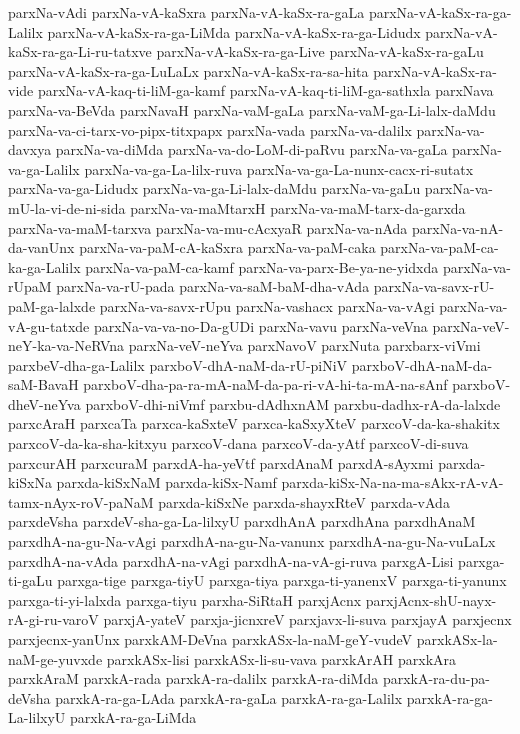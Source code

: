 {parxNa-vAdi
parxNa-vA-kaSxra
parxNa-vA-kaSx-ra-gaLa
parxNa-vA-kaSx-ra-ga-Lalilx
parxNa-vA-kaSx-ra-ga-LiMda
parxNa-vA-kaSx-ra-ga-Lidudx
parxNa-vA-kaSx-ra-ga-Li-ru-tatxve
parxNa-vA-kaSx-ra-ga-Live
parxNa-vA-kaSx-ra-gaLu
parxNa-vA-kaSx-ra-ga-LuLaLx
parxNa-vA-kaSx-ra-sa-hita
parxNa-vA-kaSx-ra-vide
parxNa-vA-kaq-ti-liM-ga-kamf
parxNa-vA-kaq-ti-liM-ga-sathxla
parxNava
parxNa-va-BeVda
parxNavaH
parxNa-vaM-gaLa
parxNa-vaM-ga-Li-lalx-daMdu
parxNa-va-ci-tarx-vo-pipx-titxpapx
parxNa-vada
parxNa-va-dalilx
parxNa-va-davxya
parxNa-va-diMda
parxNa-va-do-LoM-di-paRvu
parxNa-va-gaLa
parxNa-va-ga-Lalilx
parxNa-va-ga-La-lilx-ruva
parxNa-va-ga-La-nunx-cacx-ri-sutatx
parxNa-va-ga-Lidudx
parxNa-va-ga-Li-lalx-daMdu
parxNa-va-gaLu
parxNa-va-mU-la-vi-de-ni-sida
parxNa-va-maMtarxH
parxNa-va-maM-tarx-da-garxda
parxNa-va-maM-tarxva
parxNa-va-mu-cAcxyaR
parxNa-va-nAda
parxNa-va-nA-da-vanUnx
parxNa-va-paM-cA-kaSxra
parxNa-va-paM-caka
parxNa-va-paM-ca-ka-ga-Lalilx
parxNa-va-paM-ca-kamf
parxNa-va-parx-Be-ya-ne-yidxda
parxNa-va-rUpaM
parxNa-va-rU-pada
parxNa-va-saM-baM-dha-vAda
parxNa-va-savx-rU-paM-ga-lalxde
parxNa-va-savx-rUpu
parxNa-vashacx
parxNa-va-vAgi
parxNa-va-vA-gu-tatxde
parxNa-va-va-no-Da-gUDi
parxNa-vavu
parxNa-veVna
parxNa-veV-neY-ka-va-NeRVna
parxNa-veV-neYva
parxNavoV
parxNuta
parxbarx-viVmi
parxbeV-dha-ga-Lalilx
parxboV-dhA-naM-da-rU-piNiV
parxboV-dhA-naM-da-saM-BavaH
parxboV-dha-pa-ra-mA-naM-da-pa-ri-vA-hi-ta-mA-na-sAnf
parxboV-dheV-neYva
parxboV-dhi-niVmf
parxbu-dAdhxnAM
parxbu-dadhx-rA-da-lalxde
parxcAraH
parxcaTa
parxca-kaSxteV
parxca-kaSxyXteV
parxcoV-da-ka-shakitx
parxcoV-da-ka-sha-kitxyu
parxcoV-dana
parxcoV-da-yAtf
parxcoV-di-suva
parxcurAH
parxcuraM
parxdA-ha-yeVtf
parxdAnaM
parxdA-sAyxmi
parxda-kiSxNa
parxda-kiSxNaM
parxda-kiSx-Namf
parxda-kiSx-Na-na-ma-sAkx-rA-vA-tamx-nAyx-roV-paNaM
parxda-kiSxNe
parxda-shayxRteV
parxda-vAda
parxdeVsha
parxdeV-sha-ga-La-lilxyU
parxdhAnA
parxdhAna
parxdhAnaM
parxdhA-na-gu-Na-vAgi
parxdhA-na-gu-Na-vanunx
parxdhA-na-gu-Na-vuLaLx
parxdhA-na-vAda
parxdhA-na-vAgi
parxdhA-na-vA-gi-ruva
parxgA-Lisi
parxga-ti-gaLu
parxga-tige
parxga-tiyU
parxga-tiya
parxga-ti-yanenxV
parxga-ti-yanunx
parxga-ti-yi-lalxda
parxga-tiyu
parxha-SiRtaH
parxjAcnx
parxjAcnx-shU-nayx-rA-gi-ru-varoV
parxjA-yateV
parxja-jicnxreV
parxjavx-li-suva
parxjayA
parxjecnx
parxjecnx-yanUnx
parxkAM-DeVna
parxkASx-la-naM-geY-vudeV
parxkASx-la-naM-ge-yuvxde
parxkASx-lisi
parxkASx-li-su-vava
parxkArAH
parxkAra
parxkAraM
parxkA-rada
parxkA-ra-dalilx
parxkA-ra-diMda
parxkA-ra-du-pa-deVsha
parxkA-ra-ga-LAda
parxkA-ra-gaLa
parxkA-ra-ga-Lalilx
parxkA-ra-ga-La-lilxyU
parxkA-ra-ga-LiMda
}
